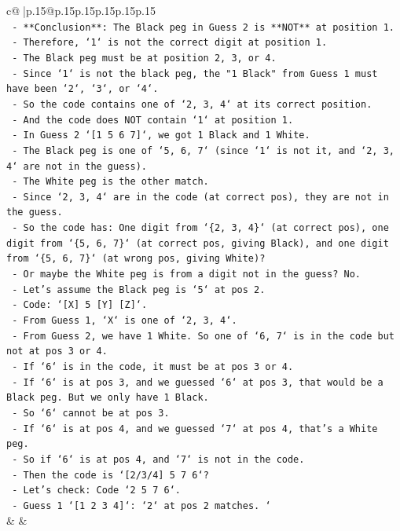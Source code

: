 \documentclass{article}
\begin{document}
{\begin{supertabular}{c@{$\;$}|p{.15\linewidth}@{}p{.15\linewidth}p{.15\linewidth}p{.15\linewidth}p{.15\linewidth}p{.15\linewidth}}
{{{\\ 
\texttt{    {-}   **Conclusion**: The Black peg in Guess 2 is **NOT** at position 1.} \\
\texttt{    {-}   Therefore, `1` is not the correct digit at position 1.} \\
\texttt{    {-}   The Black peg must be at position 2, 3, or 4.} \\
\texttt{    {-}   Since `1` is not the black peg, the "1 Black" from Guess 1 must have been `2`, `3`, or `4`.} \\
\texttt{    {-}   So the code contains one of `2, 3, 4` at its correct position.} \\
\texttt{    {-}   And the code does NOT contain `1` at position 1.} \\
\texttt{    {-}   In Guess 2 `{[}1 5 6 7{]}`, we got 1 Black and 1 White.} \\
\texttt{    {-}   The Black peg is one of `5, 6, 7` (since `1` is not it, and `2, 3, 4` are not in the guess).} \\
\texttt{    {-}   The White peg is the other match.} \\
\texttt{    {-}   Since `2, 3, 4` are in the code (at correct pos), they are not in the guess.} \\
\texttt{    {-}   So the code has: One digit from `\{2, 3, 4\}` (at correct pos), one digit from `\{5, 6, 7\}` (at correct pos, giving Black), and one digit from `\{5, 6, 7\}` (at wrong pos, giving White)?} \\
\texttt{    {-}   Or maybe the White peg is from a digit not in the guess? No.} \\
\texttt{    {-}   Let's assume the Black peg is `5` at pos 2.} \\
\texttt{        {-}   Code: `{[}X{]} 5 {[}Y{]} {[}Z{]}`.} \\
\texttt{        {-}   From Guess 1, `X` is one of `2, 3, 4`.} \\
\texttt{        {-}   From Guess 2, we have 1 White. So one of `6, 7` is in the code but not at pos 3 or 4.} \\
\texttt{        {-}   If `6` is in the code, it must be at pos 3 or 4.} \\
\texttt{        {-}   If `6` is at pos 3, and we guessed `6` at pos 3, that would be a Black peg. But we only have 1 Black.} \\
\texttt{        {-}   So `6` cannot be at pos 3.} \\
\texttt{        {-}   If `6` is at pos 4, and we guessed `7` at pos 4, that's a White peg.} \\
\texttt{        {-}   So if `6` is at pos 4, and `7` is not in the code.} \\
\texttt{        {-}   Then the code is `{[}2/3/4{]} 5 7 6`?} \\
\texttt{        {-}   Let's check: Code `2 5 7 6`.} \\
\texttt{        {-}   Guess 1 `{[}1 2 3 4{]}`: `2` at pos 2 matches. `} \\
            }
        }
    }
    & & \\ \\


\end{supertabular}}
\end{document}
